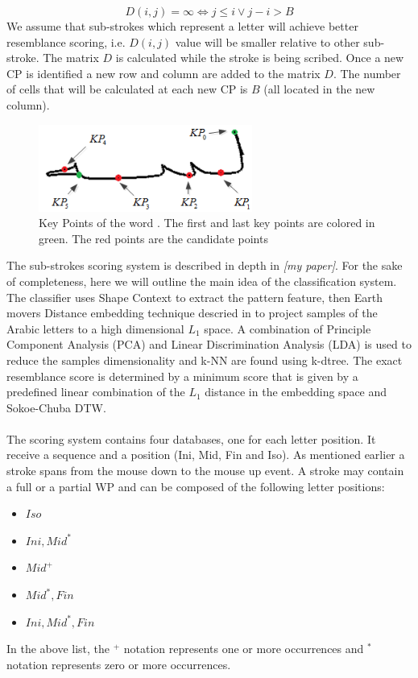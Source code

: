 \documentclass[journal,compsoc]{IEEEtran}
\begin{document}
\begin{equation}
D(i,j)=\infty \Leftrightarrow j \leq i \vee j-i>B 
\end{equation}
We assume that sub-strokes which represent a letter will achieve better resemblance scoring, i.e. $D(i,j)$ value will be smaller relative to other sub-stroke. The matrix $D$ is calculated while the stroke is being scribed. Once a new CP is identified a new row and column are added to the matrix $D$. 
The number of cells that will be calculated at each new CP is $B$ (all located in the new column).\\

\begin{figure}
\centering
\includegraphics[width=7cm]{./figures/candidate_points}
\caption{Key Points of the word  . The first and last key points are colored in green. The red points are the candidate points}
\label{fig:candidate_points}
\end{figure}

The sub-strokes scoring system is described in depth in \emph{[my paper]}. For the sake of completeness, here we will outline the main idea of the classification system. The classifier uses Shape Context to extract the pattern feature, then Earth movers Distance embedding technique descried in \cite{shirdhonkar2008approximate} to project samples of the Arabic letters to a high dimensional $L_{1}$ space. A combination of Principle Component Analysis (PCA) and Linear Discrimination Analysis (LDA) is used to reduce the samples dimensionality and k-NN are found using k-dtree. The exact resemblance score is determined by a minimum score that is given by a predefined linear combination of the $L_{1}$ distance in the embedding space and Sokoe-Chuba DTW.\\
\\

The scoring system contains four databases, one for each letter position. It receive a sequence and a position (Ini, Mid, Fin and Iso).
As mentioned earlier a stroke spans from the mouse down to the mouse up event. 
A stroke may contain a full or a partial WP and can be composed of the following letter positions: 
\begin{multicols}{2}
\begin{itemize}
    \item $Iso$
    \item $Ini,Mid^{*}$
    \item $Mid^{+}$    
    \item $Mid^{*},Fin$
    \item $Ini,Mid^{*},Fin$
\end{itemize}
\end{multicols}
In the above list, the $^{+}$ notation represents one or more occurrences and $^{*}$ notation represents zero or more occurrences.
\end{document}
